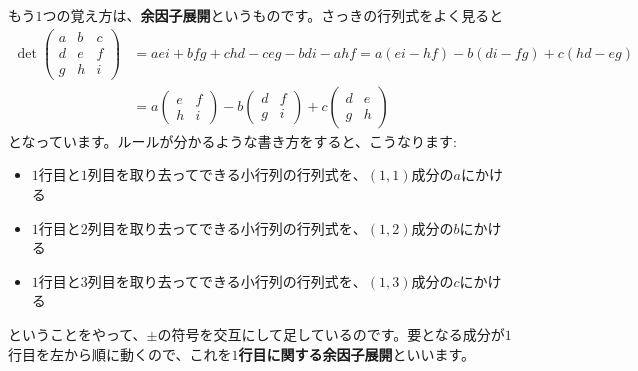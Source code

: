 
もう$1$つの覚え方は、\textbf{余因子展開}というものです。さっきの行列式をよく見ると
\begin{align*}
\det
\begin{pmatrix}
a & b & c \\
d & e & f \\
g & h & i
\end{pmatrix}
&=  aei + bfg + chd - ceg - bdi - ahf
= a(ei - hf) - b(di - fg) + c(hd - eg) \\
&=
a
\begin{pmatrix}
e & f \\
h & i
\end{pmatrix}
- b
\begin{pmatrix}
d & f \\
g & i
\end{pmatrix}
+ c
\begin{pmatrix}
d & e \\
g & h
\end{pmatrix}
\end{align*}
となっています。ルールが分かるような書き方をすると、こうなります:
\begin{itemize}
\item $1$行目と$1$列目を取り去ってできる小行列の行列式を、$(1, 1)$成分の$a$にかける
\item $1$行目と$2$列目を取り去ってできる小行列の行列式を、$(1, 2)$成分の$b$にかける
\item $1$行目と$3$列目を取り去ってできる小行列の行列式を、$(1, 3)$成分の$c$にかける
\end{itemize}
ということをやって、$\pm$の符号を交互にして足しているのです。要となる成分が$1$行目を左から順に動くので、これを\textbf{$1$行目に関する余因子展開}といいます。

